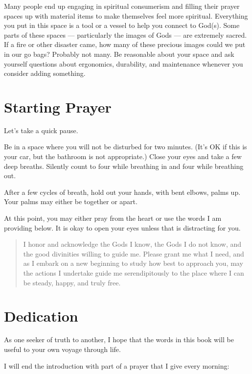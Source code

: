 \documentclass[
]{book}
\begin{document}
Many people end up engaging in spiritual consumerism and filling their prayer spaces up with material items to make themselves feel more spiritual. Everything you put in this space is a tool or a vessel to help you connect to God(s). Some parts of these spaces --- particularly the images of Gods --- are extremely sacred. If a fire or other disaster came, how many of these precious images could we put in our go bags? Probably not many. Be reasonable about your space and ask yourself questions about ergonomics, durability, and maintenance whenever you consider adding something.

\hypertarget{starting-prayer}{%
\section{Starting Prayer}\label{starting-prayer}}

Let's take a quick pause.

Be in a space where you will not be disturbed for two minutes. (It's OK if this is your car, but the bathroom is not appropriate.) Close your eyes and take a few deep breaths. Silently count to four while breathing in and four while breathing out.

After a few cycles of breath, hold out your hands, with bent elbows, palms up. Your palms may either be together or apart.

At this point, you may either pray from the heart or use the words I am providing below. It is okay to open your eyes unless that is distracting for you.

\begin{quote}
I honor and acknowledge the Gods I know, the Gods I do not know, and the good divinities willing to guide me. Please grant me what I need, and as I embark on a new beginning to study how best to approach you, may the actions I undertake guide me serendipitously to the place where I can be steady, happy, and truly free.
\end{quote}

\hypertarget{dedication}{%
\section{Dedication}\label{dedication}}

As one seeker of truth to another, I hope that the words in this book will be useful to your own voyage through life.

I will end the introduction with part of a prayer that I give every morning:
\end{document}
